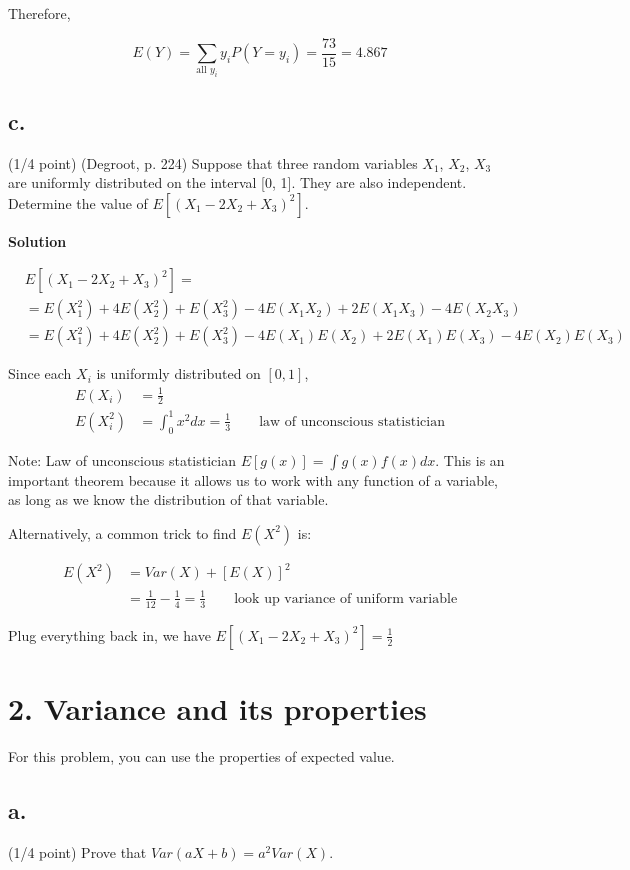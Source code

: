 \documentclass{article}\usepackage[]{graphicx}\usepackage[]{color}
\begin{document}
Therefore,

$$E(Y) = \sum_{\text{all $y_i$}} y_i P(Y = y_i) = \frac{73}{15} = 4.867$$

\subsection*{c.} (1/4 point) (Degroot, p. 224) Suppose that three random variables $X_1$, $X_2$, $X_3$ are uniformly distributed on the interval [0, 1]. They are also independent. Determine the value of $E[(X_1 - 2X_2 + X_3)^2]$.

\textbf{Solution}

\begin{align}
&E[(X_1 - 2 X_2 + X_3)^2] = \\
&= E(X_1^2) + 4E(X_2^2) + E(X_3^2) - 4E(X_1X_2) + 2E(X_1X_3) - 4E(X_2X_3) \\
&= E(X_1^2) + 4E(X_2^2) + E(X_3^2) - 4E(X_1)E(X_2) + 2E(X_1)E(X_3) - 4E(X_2)E(X_3)
\end{align}

Since each $X_i$ is uniformly distributed on $[0, 1]$,
\begin{align}
E(X_i) &= \frac{1}{2} \\
E(X_i^2) &= \int_0^1 x^2 dx = \frac{1}{3} \qquad{\text{law of unconscious statistician}}
\end{align}

Note: Law of unconscious statistician $E[g(x)] = \int g(x)f(x) dx$. This is an important theorem because it allows us to work with any function of a variable, as long as we know the distribution of that variable.

Alternatively, a common trick to find $E(X^2)$ is:

\begin{align}
E(X^2) &= Var(X) + [E(X)]^2 \\
&= \frac{1}{12} - \frac{1}{4} = \frac{1}{3} \qquad{\text{look up variance of uniform variable}}
\end{align}

Plug everything back in, we have $E[(X_1 - 2 X_2 + X_3)^2] = \frac{1}{2}$

\section*{2. Variance and its properties}

For this problem, you can use the properties of expected value.

\subsection*{a.} (1/4 point) Prove that $Var(aX + b) = a^2 Var(X)$.
\end{document}
